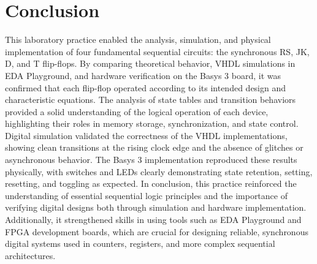 \documentclass[12pt]{article}  %
\begin{document}
\section{Conclusion}
This laboratory practice enabled the analysis, simulation, and physical implementation of four fundamental sequential circuits: the synchronous RS, JK, D, and T flip-flops. By comparing theoretical behavior, VHDL simulations in EDA Playground, and hardware verification on the Basys 3 board, it was confirmed that each flip-flop operated according to its intended design and characteristic equations.
The analysis of state tables and transition behaviors provided a solid understanding of the logical operation of each device, highlighting their roles in memory storage, synchronization, and state control. Digital simulation validated the correctness of the VHDL implementations, showing clean transitions at the rising clock edge and the absence of glitches or asynchronous behavior. The Basys 3 implementation reproduced these results physically, with switches and LEDs clearly demonstrating state retention, setting, resetting, and toggling as expected.
In conclusion, this practice reinforced the understanding of essential sequential logic principles and the importance of verifying digital designs both through simulation and hardware implementation. Additionally, it strengthened skills in using tools such as EDA Playground and FPGA development boards, which are crucial for designing reliable, synchronous digital systems used in counters, registers, and more complex sequential architectures.
\clearpage %
\end{document}
